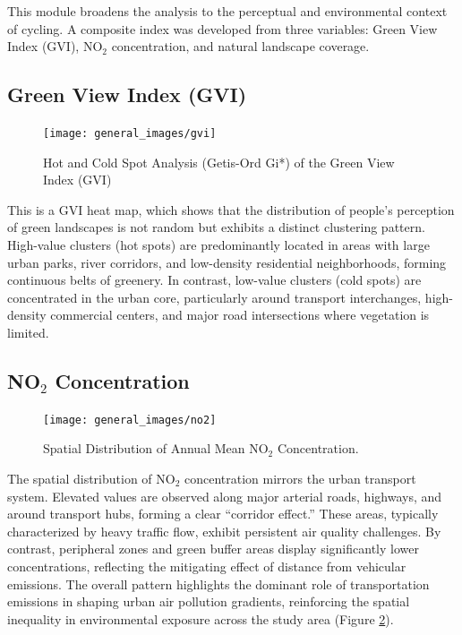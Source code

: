 \documentclass[
  12pt,
  oneside]{book}
\begin{document}
This module broadens the analysis to the perceptual and environmental context of cycling. A composite index was developed from three variables: Green View Index (GVI), NO\(_2\) concentration, and natural landscape coverage.

\subsection{Green View Index (GVI)}\label{green-view-index-gvi}

\begin{figure}

{\centering \texttt{[image: general\_images/gvi]} 

}

\caption{Hot and Cold Spot Analysis (Getis-Ord Gi*) of the Green View Index (GVI)}\label{fig:gvi}
\end{figure}

This is a GVI heat map, which shows that the distribution of people's perception of green landscapes is not random but exhibits a distinct clustering pattern. High-value clusters (hot spots) are predominantly located in areas with large urban parks, river corridors, and low-density residential neighborhoods, forming continuous belts of greenery. In contrast, low-value clusters (cold spots) are concentrated in the urban core, particularly around transport interchanges, high-density commercial centers, and major road intersections where vegetation is limited.

\subsection{\texorpdfstring{NO\(_2\) Concentration}{NO\_2 Concentration}}\label{no_2-concentration}

\begin{figure}

{\centering \texttt{[image: general\_images/no2]} 

}

\caption{Spatial Distribution of Annual Mean NO$_2$ Concentration.}\label{fig:no2}
\end{figure}

The spatial distribution of NO\(_2\) concentration mirrors the urban transport system. Elevated values are observed along major arterial roads, highways, and around transport hubs, forming a clear ``corridor effect.'' These areas, typically characterized by heavy traffic flow, exhibit persistent air quality challenges. By contrast, peripheral zones and green buffer areas display significantly lower concentrations, reflecting the mitigating effect of distance from vehicular emissions. The overall pattern highlights the dominant role of transportation emissions in shaping urban air pollution gradients, reinforcing the spatial inequality in environmental exposure across the study area (Figure \ref{fig:no2}).
\end{document}
